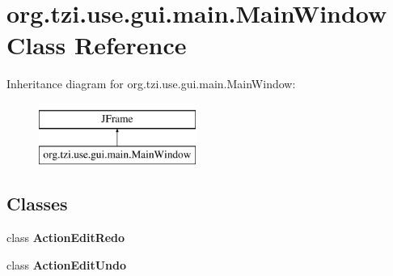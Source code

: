 \hypertarget{classorg_1_1tzi_1_1use_1_1gui_1_1main_1_1_main_window}{\section{org.\-tzi.\-use.\-gui.\-main.\-Main\-Window Class Reference}
\label{classorg_1_1tzi_1_1use_1_1gui_1_1main_1_1_main_window}
}
Inheritance diagram for org.\-tzi.\-use.\-gui.\-main.\-Main\-Window\-:\begin{figure}[H]
\begin{center}
\leavevmode
\includegraphics[height=2.000000cm]{classorg_1_1tzi_1_1use_1_1gui_1_1main_1_1_main_window}
\end{center}
\end{figure}
\subsection*{Classes}
\begin{DoxyCompactItemize}
\item 
class {\bfseries Action\-Edit\-Redo}
\item 
class {\bfseries Action\-Edit\-Undo}
\end{DoxyCompactItemize}
